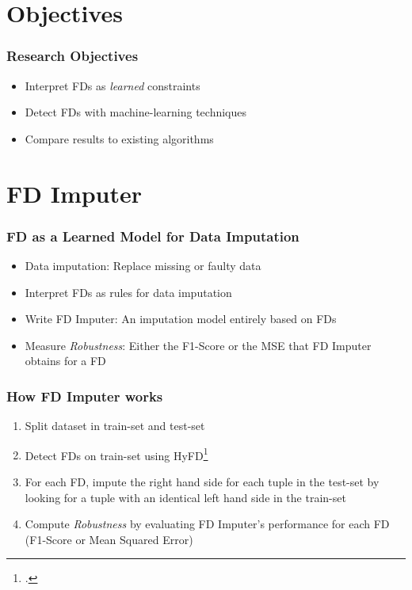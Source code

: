 \documentclass{beamer}
\begin{document}
\section{Objectives}
\begin{frame}
    \frametitle{Research Objectives}
    \begin{itemize}
        \item Interpret FDs as \emph{learned} constraints
        \item Detect FDs with machine-learning techniques
        \item Compare results to existing algorithms
    \end{itemize}
\end{frame}


\section{FD Imputer}
\begin{frame}
    \frametitle{FD as a Learned Model for Data Imputation}
    \begin{itemize}
        \item Data imputation: Replace missing or faulty data
        \item Interpret FDs as rules for data imputation
        \item Write FD Imputer: An imputation model entirely based on FDs
        \item Measure \emph{Robustness}: Either the F1-Score or the MSE that FD Imputer obtains for a FD
    \end{itemize}
\end{frame}

\begin{frame}
    \frametitle{How FD Imputer works}
    \begin{enumerate}
        \item Split dataset in train-set and test-set
        \item Detect FDs on train-set using HyFD\footcite{PAP16}
        \item For each FD, impute the right hand side for each tuple in the test-set by looking for a tuple with an identical left hand side in the train-set
        \item Compute \emph{Robustness} by evaluating FD Imputer's performance for each FD (F1-Score or Mean Squared Error)
    \end{enumerate}
\end{frame}
\end{document}
